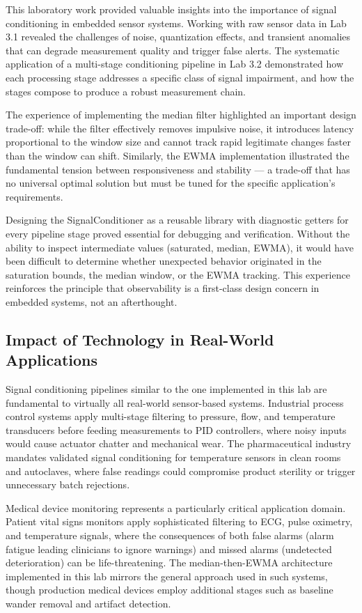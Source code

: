 This laboratory work provided valuable insights into the importance of signal conditioning in embedded sensor systems. Working with raw sensor data in Lab 3.1 revealed the challenges of noise, quantization effects, and transient anomalies that can degrade measurement quality and trigger false alerts. The systematic application of a multi-stage conditioning pipeline in Lab 3.2 demonstrated how each processing stage addresses a specific class of signal impairment, and how the stages compose to produce a robust measurement chain.

The experience of implementing the median filter highlighted an important design trade-off: while the filter effectively removes impulsive noise, it introduces latency proportional to the window size and cannot track rapid legitimate changes faster than the window can shift. Similarly, the EWMA implementation illustrated the fundamental tension between responsiveness and stability --- a trade-off that has no universal optimal solution but must be tuned for the specific application's requirements.

Designing the SignalConditioner as a reusable library with diagnostic getters for every pipeline stage proved essential for debugging and verification. Without the ability to inspect intermediate values (saturated, median, EWMA), it would have been difficult to determine whether unexpected behavior originated in the saturation bounds, the median window, or the EWMA tracking. This experience reinforces the principle that observability is a first-class design concern in embedded systems, not an afterthought.

\subsection{Impact of Technology in Real-World Applications}

Signal conditioning pipelines similar to the one implemented in this lab are fundamental to virtually all real-world sensor-based systems. Industrial process control systems apply multi-stage filtering to pressure, flow, and temperature transducers before feeding measurements to PID controllers, where noisy inputs would cause actuator chatter and mechanical wear. The pharmaceutical industry mandates validated signal conditioning for temperature sensors in clean rooms and autoclaves, where false readings could compromise product sterility or trigger unnecessary batch rejections.

Medical device monitoring represents a particularly critical application domain. Patient vital signs monitors apply sophisticated filtering to ECG, pulse oximetry, and temperature signals, where the consequences of both false alarms (alarm fatigue leading clinicians to ignore warnings) and missed alarms (undetected deterioration) can be life-threatening. The median-then-EWMA architecture implemented in this lab mirrors the general approach used in such systems, though production medical devices employ additional stages such as baseline wander removal and artifact detection.

